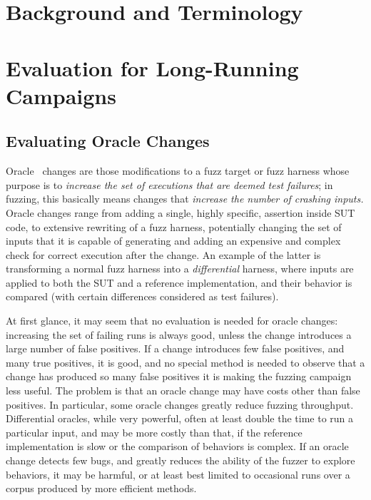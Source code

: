 \section{Background and Terminology}

\section{Evaluation for Long-Running Campaigns}

\subsection{Evaluating Oracle Changes}

Oracle~\cite{Barr2015,Staats:2011:PTO:1985793.1985847} changes are those modifications to a fuzz target or fuzz harness whose purpose is to \emph{increase the set of executions that are deemed test failures}; in fuzzing, this basically means changes that \emph{increase the number of crashing inputs.}  Oracle changes range from adding a single, highly specific, assertion inside SUT code, to extensive rewriting of a fuzz harness, potentially changing the set of inputs that it is capable of generating and adding an expensive and complex check for correct execution after the change.   An example of the latter is transforming a normal fuzz harness into a \emph{differential}\cite{Differential} harness, where inputs are applied to both the SUT and a reference implementation, and their behavior is compared (with certain differences considered as test failures).

At first glance, it may seem that no evaluation is needed for oracle changes: increasing the set of failing runs is always good, unless the change introduces a large number of false positives.  If a change introduces few false positives, and many true positives, it is good, and no special method is needed to observe that a change has produced so many false positives it is making the fuzzing campaign less useful.  The problem is that an oracle change may have costs other than false positives.  In particular, some oracle changes greatly reduce fuzzing throughput.  Differential oracles, while very powerful, often at least double the time to run a particular input, and may be more costly than that, if the reference implementation is slow or the comparison of behaviors is complex.  If an oracle change detects few bugs, and greatly reduces the ability of the fuzzer to explore behaviors, it may be harmful, or at least best limited to occasional runs over a corpus produced by more efficient methods.